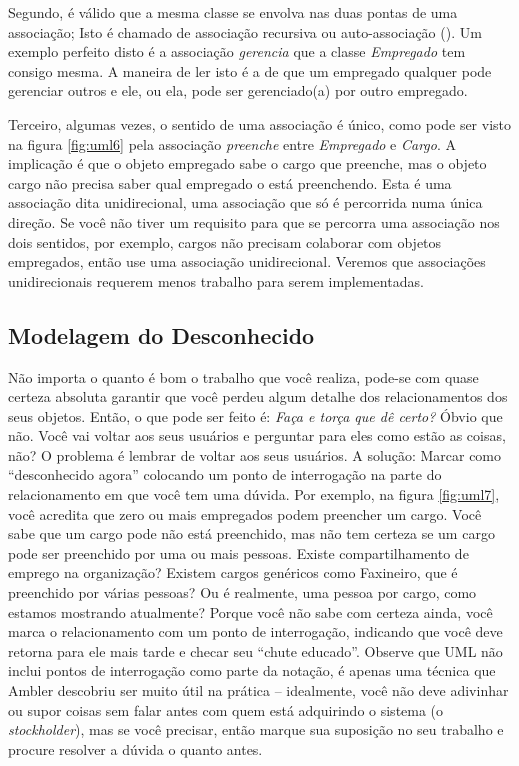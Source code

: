 Segundo, é válido que a mesma classe se envolva nas duas pontas de uma associação; Isto é chamado de associação recursiva ou auto-associação (). Um exemplo perfeito disto é a associação \emph{gerencia} que a classe \emph{Empregado} tem consigo mesma. A maneira de ler isto é a de que um empregado qualquer pode gerenciar outros e ele, ou ela, pode ser gerenciado(a) por outro empregado.

Terceiro, algumas vezes, o sentido de uma associação é único, como pode ser visto na figura \ref{fig:uml6} pela associação \emph{preenche} entre \emph{Empregado} e \emph{Cargo}. A implicação é que o objeto empregado sabe o cargo que preenche, mas o objeto cargo não precisa saber qual empregado o está preenchendo. Esta é uma associação dita unidirecional, uma associação que só é percorrida numa única direção. Se você não tiver um requisito para que se percorra uma associação nos dois sentidos, por exemplo, cargos não precisam colaborar com objetos empregados, então use uma associação unidirecional. Veremos que associações unidirecionais requerem menos trabalho para serem implementadas.

\subsection{Modelagem do Desconhecido}

Não importa o quanto é bom o trabalho que você realiza, pode-se com quase certeza absoluta garantir que você perdeu algum detalhe dos relacionamentos dos seus objetos. Então, o que pode ser feito é: \textit{Faça e torça que dê certo?} Óbvio que não. Você vai voltar aos seus usuários e perguntar para eles como estão as coisas, não? O problema é lembrar de voltar aos seus usuários. A solução: Marcar como ``desconhecido agora'' colocando um ponto de interrogação na parte do relacionamento em que você tem uma dúvida. Por exemplo, na figura \ref{fig:uml7}, você acredita que zero ou mais empregados podem preencher um cargo. Você sabe que um cargo pode não está preenchido, mas não tem certeza se um cargo pode ser preenchido por uma ou mais pessoas. Existe compartilhamento de emprego na organização? Existem cargos genéricos como Faxineiro, que é preenchido por várias pessoas? Ou é realmente, uma pessoa por cargo, como estamos mostrando atualmente? Porque você não sabe com certeza ainda, você marca o relacionamento com um ponto de interrogação, indicando que você deve retorna para ele mais tarde e checar seu ``chute educado''. Observe que UML não inclui pontos de interrogação como parte da notação, é apenas uma técnica que Ambler descobriu ser muito útil na prática -- idealmente, você não deve adivinhar ou supor coisas sem falar antes com quem está adquirindo o sistema (o \textit{stockholder}), mas se você precisar, então marque sua suposição no seu trabalho e procure resolver a dúvida o quanto antes.

